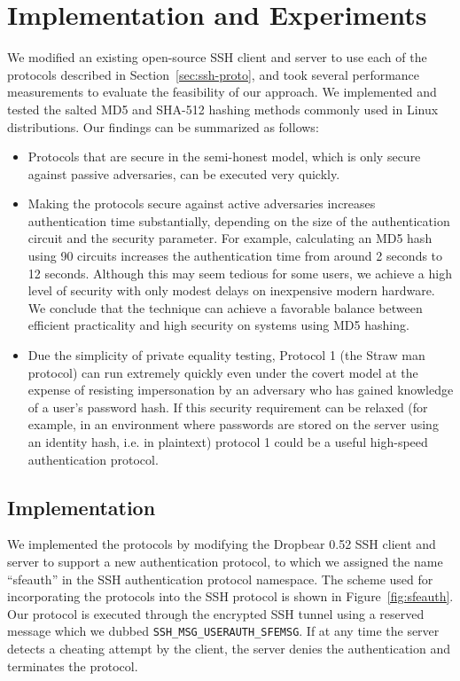 
\section{Implementation and Experiments}
\label{sec:ssh-eval}

We modified an existing open-source SSH client and server to use each
of the protocols described in Section~\ref{sec:ssh-proto}, and took
several performance measurements to evaluate the feasibility of our
approach.  We implemented and tested the salted MD5 and SHA-512 hashing methods
commonly used in Linux distributions.  Our findings can be summarized as follows:
\begin{itemize}
\item Protocols that are secure in the semi-honest model, which is only 
secure against passive adversaries, can be executed very quickly.
\item Making the protocols secure against active adversaries
increases authentication time substantially, depending on the size of
the authentication circuit and the security parameter.  For example,
calculating an MD5 hash using 90 circuits increases the authentication
time from around 2 seconds to 12 seconds.  Although this may seem
tedious for some users, we achieve a high level of security with only
modest delays on inexpensive modern hardware.  We conclude that the technique
can achieve a favorable balance between efficient practicality and high
security on systems using MD5 hashing.

\item Due the simplicity of private equality testing, Protocol 1 (the Straw man protocol)
can run extremely quickly even under the covert model at the expense
of resisting impersonation by an adversary who has gained knowledge of
a user's password hash.  If this security requirement can be relaxed
(for example, in an environment where passwords are stored on the
server using an identity hash, i.e. in plaintext) protocol 1 could be
a useful high-speed authentication protocol.
\end{itemize}

\subsection{Implementation}

We implemented the protocols by modifying the Dropbear 0.52 SSH client
and server to support a new authentication protocol, to which we
assigned the name {}``sfeauth'' in the SSH authentication protocol
namespace. The scheme used for incorporating the protocols into the
SSH protocol is shown in Figure~\ref{fig:sfeauth}. Our
protocol is executed through the encrypted SSH tunnel using a
reserved message which we dubbed
\texttt{SSH\_MSG\_USERAUTH\_SFEMSG}. If at any time the server detects
a cheating attempt by the client, the server denies the authentication
and terminates the protocol.

